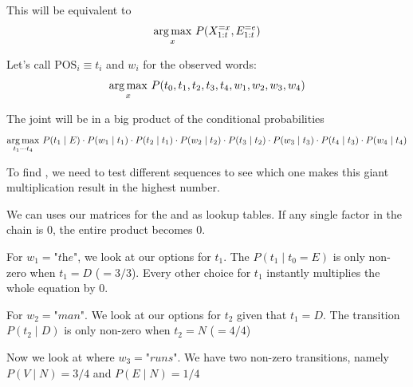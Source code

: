 
This will be equivalent to
\[
\mathop{\mathrm{arg\,max}}_{x}\, P(X_{1:t}^{=x} , E_{1:t}^{=e})
\] 

Let's call $\text{POS}_i \equiv t_i$ and $w_i$ for the observed words:
\[
\mathop{\mathrm{arg\,max}}_{x}\, P(t_0,t_1, t_2, t_3, t_4, w_1, w_2, w_3, w_4)
\] 

The joint will be in a big product of the conditional probabilities
\[
\mathop{\mathrm{arg\,max}}_{t_1 \cdots t_4}\, P(t_1 \mid E) \cdot P(w_1 \mid t_1) \cdot 
P(t_2 \mid t_1) \cdot P(w_2 \mid t_2) \cdot 
P(t_3 \mid t_2) \cdot P(w_3 \mid t_3) \cdot 
P(t_4 \mid t_3) \cdot P(w_4 \mid t_4)
\] 

To find , we need to test different  sequences to see which one makes this giant multiplication result in the highest number.

We can uses our matrices for the  and  as lookup tables. If any single factor in the chain is $0$, the entire product becomes $0$.


For $w_1 = \textit{"the"}$, we look at our options for $t_1$. The  $P(t_1 \mid t_0 = E)$ is only non-zero when $t_1 = D$ ($=3/3$). Every other choice for $t_1$ instantly multiplies the whole equation by $0$.

For $w_2 = \textit{"man"}$. We look at our options for $t_2$ given that $t_1 = D$. The transition $P(t_2 \mid D)$ is only non-zero when $t_2 = N$ ($=4/4$)


Now we look at where $w_3 = \textit{"runs"}$. We have two non-zero transitions, namely $P(V \mid N) = 3/4$ and $P(E \mid N) = 1/4$

